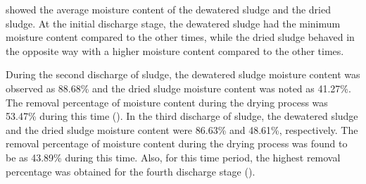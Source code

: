 

 showed the average moisture content of the dewatered sludge and the dried sludge. At the initial discharge stage, the dewatered sludge had the minimum moisture content compared to the other times, while the dried sludge behaved in the opposite way with a higher moisture content compared to the other times.

During the second discharge of sludge, the dewatered sludge moisture content was observed as 88.68\% and the dried sludge moisture content was noted as 41.27\%. The removal percentage of moisture content during the drying process was 53.47\% during this time (). In the third discharge of sludge, the dewatered sludge and the dried sludge moisture content were 86.63\% and 48.61\%, respectively. The removal percentage of moisture content during the drying process was found to be as 43.89\% during this time. Also, for this time period, the highest removal percentage was obtained for the fourth discharge stage ().

